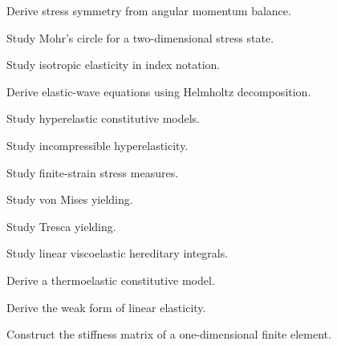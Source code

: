 \begin{exercise}[4]
Derive stress symmetry from angular momentum balance.
\end{exercise}

\begin{exercise}[4]
Study Mohr's circle for a two-dimensional stress state.
\end{exercise}

\begin{exercise}[4]
Study isotropic elasticity in index notation.
\end{exercise}

\begin{exercise}[4]
Derive elastic-wave equations using Helmholtz decomposition.
\end{exercise}

\begin{exercise}[4]
Study hyperelastic constitutive models.
\end{exercise}

\begin{exercise}[4]
Study incompressible hyperelasticity.
\end{exercise}

\begin{exercise}[4]
Study finite-strain stress measures.
\end{exercise}

\begin{exercise}[4]
Study von Mises yielding.
\end{exercise}

\begin{exercise}[4]
Study Tresca yielding.
\end{exercise}

\begin{exercise}[4]
Study linear viscoelastic hereditary integrals.
\end{exercise}

\begin{exercise}[4]
Derive a thermoelastic constitutive model.
\end{exercise}

\begin{exercise}[4]
Derive the weak form of linear elasticity.
\end{exercise}

\begin{exercise}[4]
Construct the stiffness matrix of a one-dimensional finite element.
\end{exercise}

